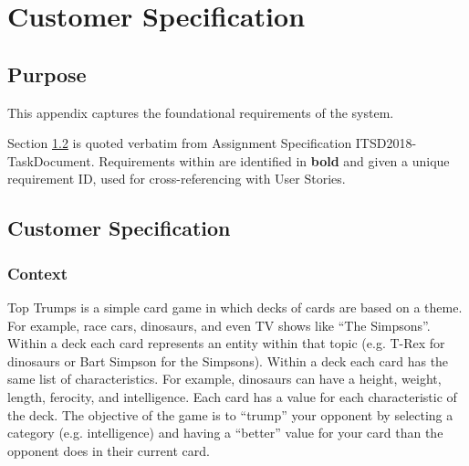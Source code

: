 \newpage
\section{Customer Specification}

\newcommand{\creq}[1]{
    [\textbf{C\arabic{cReqNum}: #1}]%
    \addtocounter{cReqNum}{10}%
}

\newcommand{\areq}[1]{
    [\textbf{A\arabic{aReqNum}: #1}]%
    \addtocounter{aReqNum}{10}%
}

\subsection{Purpose}

This appendix captures the foundational requirements of the system.

Section \ref{contract} is quoted verbatim from Assignment Specification ITSD2018-TaskDocument.
Requirements within are identified in \textbf{bold} and given a unique requirement ID, used for cross-referencing with User Stories.

\subsection{Customer Specification} \label{contract}
\setcounter{cReqNum}{1000}
\subsubsection{Context}
Top Trumps is a simple card game in which decks of cards are based on a theme.
For example, race cars, dinosaurs, and even TV shows like ``The Simpsons''.
Within a deck each card represents an entity within that topic (e.g. T-Rex for dinosaurs or Bart Simpson for the Simpsons).
Within a deck each card has the same list of characteristics.
For example, dinosaurs can have a height, weight, length, ferocity, and intelligence.
Each card has a value for each characteristic of the deck.
The objective of the game is to ``trump'' your opponent by selecting a category (e.g. intelligence) and having a ``better'' value for your card than the opponent does in their current card.

